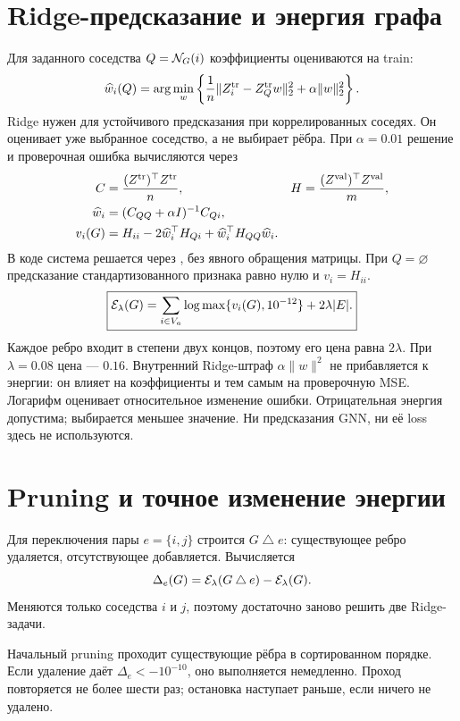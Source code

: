 \documentclass[11pt,a4paper]{article}
\begin{document}
\section{Ridge-предсказание и энергия графа}
Для заданного соседства $Q=\mathcal{N}_G(i)$ коэффициенты оцениваются на train:
\begin{equation}
 \widehat w_i(Q)=\arg\min_w
 \left\{\frac1n\|Z_i^{\rm tr}-Z_Q^{\rm tr}w\|_2^2+\alpha\|w\|_2^2\right\}.
\label{eq:ridge}
\end{equation}
Ridge нужен для устойчивого предсказания при коррелированных соседях.
Он оценивает уже выбранное соседство, а не выбирает рёбра.
При $\alpha=0.01$ решение и проверочная ошибка вычисляются через
\begin{align}
 C&=\frac{(Z^{\rm tr})^\top Z^{\rm tr}}n,
 &H&=\frac{(Z^{\rm val})^\top Z^{\rm val}}m,\\
 \widehat w_i&=(C_{QQ}+\alpha I)^{-1}C_{Qi},\\
 v_i(G)&=H_{ii}-2\widehat w_i^\top H_{Qi}
                  +\widehat w_i^\top H_{QQ}\widehat w_i.
\end{align}
В коде система решается через , без явного обращения матрицы.
При $Q=\varnothing$ предсказание стандартизованного признака равно нулю и $v_i=H_{ii}$.
\begin{equation}
 \boxed{\displaystyle
 \mathcal{E}_\lambda(G)=\sum_{i\in V_a}\log\max\{v_i(G),10^{-12}\}+2\lambda|E|.}
 \label{eq:energy}
\end{equation}
Каждое ребро входит в степени двух концов, поэтому его цена равна $2\lambda$.
При $\lambda=0.08$ цена --- $0.16$. Внутренний Ridge-штраф $\alpha\|w\|^2$
не прибавляется к энергии: он влияет на коэффициенты и тем самым на проверочную MSE.
Логарифм оценивает относительное изменение ошибки. Отрицательная энергия допустима;
выбирается меньшее значение. Ни предсказания GNN, ни её loss здесь не используются.

\section{Pruning и точное изменение энергии}
Для переключения пары $e=\{i,j\}$ строится $G\mathbin{\triangle}e$:
существующее ребро удаляется, отсутствующее добавляется. Вычисляется
\begin{equation}
 \Delta_e(G)=\mathcal{E}_\lambda(G\mathbin{\triangle}e)-\mathcal{E}_\lambda(G).
\end{equation}
Меняются только соседства $i$ и $j$, поэтому достаточно заново решить две Ridge-задачи.
\par Начальный pruning проходит существующие рёбра в сортированном порядке.
Если удаление даёт $\Delta_e<-10^{-10}$, оно выполняется немедленно.
Проход повторяется не более шести раз; остановка наступает раньше, если ничего не удалено.
\end{document}
